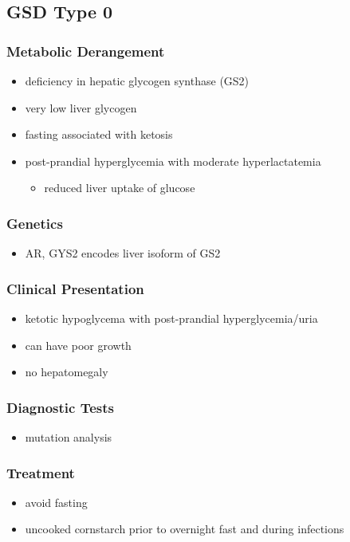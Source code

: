 \documentclass{scrartcl}
\begin{document}
\subsection{GSD Type 0}
\label{sec:org41468da}
\subsubsection{Metabolic Derangement}
\label{sec:orgc862b9b}
\begin{itemize}
\item deficiency in hepatic glycogen synthase (GS2)
\item very low liver glycogen
\item fasting associated with ketosis
\item post-prandial hyperglycemia with moderate hyperlactatemia
\begin{itemize}
\item reduced liver uptake of glucose
\end{itemize}
\end{itemize}

\subsubsection{Genetics}
\label{sec:orgd25175d}
\begin{itemize}
\item AR, GYS2 encodes liver isoform of GS2
\end{itemize}

\subsubsection{Clinical Presentation}
\label{sec:org952b604}
\begin{itemize}
\item ketotic hypoglycema with post-prandial hyperglycemia/uria
\item can have poor growth
\item no hepatomegaly
\end{itemize}

\subsubsection{Diagnostic Tests}
\label{sec:org9b9a619}
\begin{itemize}
\item mutation analysis
\end{itemize}
\subsubsection{Treatment}
\label{sec:org60b1952}
\begin{itemize}
\item avoid fasting
\item uncooked cornstarch prior to overnight fast and during infections
\end{itemize}
\end{document}
